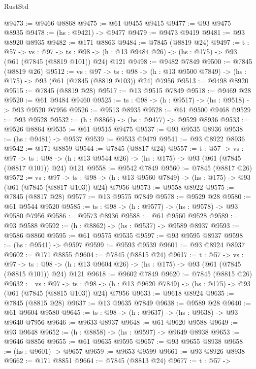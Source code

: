 \begin{lexlean}{RustStd}
\begin{coremodule}
@9473 := @9466 @8868
@9475 := @61 @9455 @9415
@9477 := @93 @9475 @8935
@9478 := (hs : @9421) -> @9477
@9479 := @9473 @9419
@9481 := @93 @8920 @8935
@9482 := @171 @8863
@9484 := @7845 (@8819 @24)
@9497 := {t : @57} ->
  {vs : @97} ->
  {ts : @98} -> (h : @13 @9484 @26) -> (hs : @175) -> @93 (@61 (@7845 (@8819 @101)) @24) @121
@9498 := @9482 @7849
@9500 := @7845 (@8819 @26)
@9512 := {vs : @97} ->
  {ts : @98} -> (h : @13 @9500 @7849) -> (hs : @175) -> @93 (@61 (@7845 (@8819 @103)) @24) @7956
@9513 := @9498 @8920
@9515 := @7845 (@8819 @28)
@9517 := @13 @9515 @7849
@9518 := @9469 @28
@9520 := @61 @9484 @9460
@9525 := {ts : @98} -> (h : @9517) -> (hs : @9518) -> @93 @9520 @7956
@9526 := @9513 @8935
@9528 := @61 @9500 @9468
@9529 := @93 @9528
@9532 := (h : @8866) -> (hs : @9477) -> @9529 @8936
@9533 := @9526 @8864
@9535 := @61 @9515 @9475
@9537 := @93 @9535 @8936
@9538 := (hs : @9481) -> @9537
@9539 := @9533 @9479
@9541 := @93 @8922 @8936
@9542 := @171 @8859
@9544 := @7845 (@8817 @24)
@9557 := {t : @57} ->
  {vs : @97} ->
  {ts : @98} -> (h : @13 @9544 @26) -> (hs : @175) -> @93 (@61 (@7845 (@8817 @101)) @24) @121
@9558 := @9542 @7849
@9560 := @7845 (@8817 @26)
@9572 := {vs : @97} ->
  {ts : @98} -> (h : @13 @9560 @7849) -> (hs : @175) -> @93 (@61 (@7845 (@8817 @103)) @24) @7956
@9573 := @9558 @8922
@9575 := @7845 (@8817 @28)
@9577 := @13 @9575 @7849
@9578 := @9529 @28
@9580 := @61 @9544 @9520
@9585 := {ts : @98} -> (h : @9577) -> (hs : @9578) -> @93 @9580 @7956
@9586 := @9573 @8936
@9588 := @61 @9560 @9528
@9589 := @93 @9588
@9592 := (h : @8862) -> (hs : @9537) -> @9589 @8937
@9593 := @9586 @8860
@9595 := @61 @9575 @9535
@9597 := @93 @9595 @8937
@9598 := (hs : @9541) -> @9597
@9599 := @9593 @9539
@9601 := @93 @8924 @8937
@9602 := @171 @8855
@9604 := @7845 (@8815 @24)
@9617 := {t : @57} ->
  {vs : @97} ->
  {ts : @98} -> (h : @13 @9604 @26) -> (hs : @175) -> @93 (@61 (@7845 (@8815 @101)) @24) @121
@9618 := @9602 @7849
@9620 := @7845 (@8815 @26)
@9632 := {vs : @97} ->
  {ts : @98} -> (h : @13 @9620 @7849) -> (hs : @175) -> @93 (@61 (@7845 (@8815 @103)) @24) @7956
@9633 := @9618 @8924
@9635 := @7845 (@8815 @28)
@9637 := @13 @9635 @7849
@9638 := @9589 @28
@9640 := @61 @9604 @9580
@9645 := {ts : @98} -> (h : @9637) -> (hs : @9638) -> @93 @9640 @7956
@9646 := @9633 @8937
@9648 := @61 @9620 @9588
@9649 := @93 @9648
@9652 := (h : @8858) -> (hs : @9597) -> @9649 @8938
@9653 := @9646 @8856
@9655 := @61 @9635 @9595
@9657 := @93 @9655 @8938
@9658 := (hs : @9601) -> @9657
@9659 := @9653 @9599
@9661 := @93 @8926 @8938
@9662 := @171 @8851
@9664 := @7845 (@8813 @24)
@9677 := {t : @57} ->

\end{coremodule}
\end{lexlean}
